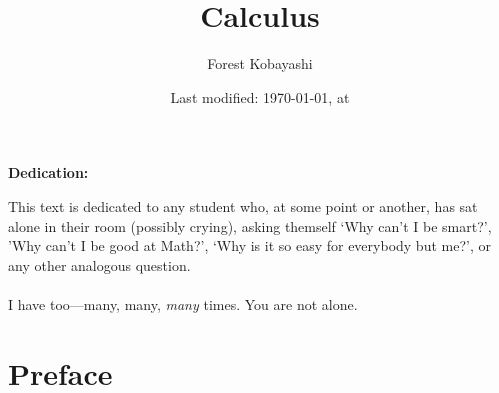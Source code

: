 \documentclass[10pt]{article}
\theoremstyle{definition}
\begin{document}
\pagestyle{fancy}

\setlength{\headheight}{0pt}
\setlength\parindent{0pt}


\setlength{\headheight}{0pt}
\pretitle{\begin{center}\Huge\bfseries}
\posttitle{\par\end{center}\vskip 0.5em}
\preauthor{\begin{center}\Large\ttfamily}
\postauthor{\end{center}}
\predate{\par\large\centering}
\postdate{\par}

\title{Calculus}
\author{Forest Kobayashi}
\date{Last modified: \today, at \the\time}
\maketitle
\thispagestyle{empty}
\clearpage
\vspace{5cm}
\begin{center}
\Large\bfseries Dedication:
\end{center}
{\large%
This text is dedicated to any student who, at some point or another,
has sat alone in their room (possibly crying), asking themself `Why
can't I be smart?', 'Why can't I be good at Math?', `Why is it so easy
for everybody but me?', or any other analogous question.  \\~\\
I have too---many, many, \emph{many} times.  You are not alone. }%
\thispagestyle{empty}
\clearpage
\tableofcontents
\clearpage
\pagestyle{fancy}
\section{Preface}
\end{document}
